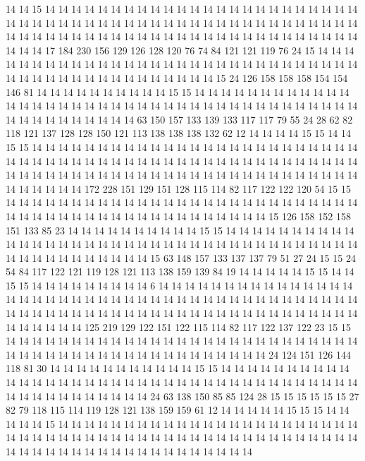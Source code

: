14 14 15 14 14 14 14 14 14 14 14 14 14 14 14 14 14 14 14 14
14 14 14 14 14 14 14 14 14 14 14 14 14 14 14 14 14 14 14 14
14 14 14 14 14 14 14 14 14 14 14 14 14 14 14 14 14 14 14 14
14 14 14 14 14 14 14 14 14 14 14 14 14 14 14 14 14 14 14 14
14 14 14 14 17 184 230 156 129 126 128 120 76 74 84 121 121 119 76 24
15 14 14 14 14 14 14 14 14 14 14 14 14 14 14 14 14 14 14 14
14 14 14 14 14 14 14 14 14 14 14 14 14 14 14 14 14 14 14 14
14 14 14 14 14 14 14 15 24 126 158 158 158 154 154 146 81 14 14 14
14 14 14 14 14 14 14 15 15 14 14 14 14 14 14 14 14 14 14 14
14 14 14 14 14 14 14 14 14 14 14 14 14 14 14 14 14 14 14 14
14 14 14 14 14 14 14 14 14 14 14 14 14 14 14 14 14 14 63 150
157 133 139 133 117 117 79 55 24 28 62 82 118 121 137 128 128 150 121 113
138 138 138 132 62 12 14 14 14 14 15 15 14 14 15 15 14 14 14 14
14 14 14 14 14 14 14 14 14 14 14 14 14 14 14 14 14 14 14 14
14 14 14 14 14 14 14 14 14 14 14 14 14 14 14 14 14 14 14 14
14 14 14 14 14 14 14 14 14 14 14 14 14 14 14 14 14 14 14 14
14 14 14 14 14 14 14 14 14 14 14 14 14 14 14 14 14 14 14 14
14 172 228 151 129 151 128 115 114 82 117 122 122 120 54 15 15 14 14 14
14 14 14 14 14 14 14 14 14 14 14 14 14 14 14 14 14 14 14 14
14 14 14 14 14 14 14 14 14 14 14 14 14 14 14 14 14 14 14 14
14 14 14 14 15 126 158 152 158 151 133 85 23 14 14 14 14 14 14 14
14 14 14 15 15 14 14 14 14 14 14 14 14 14 14 14 14 14 14 14
14 14 14 14 14 14 14 14 14 14 14 14 14 14 14 14 14 14 14 14
14 14 14 14 14 14 14 14 14 14 14 14 14 15 63 148 157 133 137 137
79 51 27 24 15 15 24 54 84 117 122 121 119 128 121 113 138 159 139 84
19 14 14 14 14 14 15 15 14 14 15 15 14 14 14 14 14 14 14 14
14 6 14 14 14 14 14 14 14 14 14 14 14 14 14 14 14 14 14 14
14 14 14 14 14 14 14 14 14 14 14 14 14 14 14 14 14 14 14 14
14 14 14 14 14 14 14 14 14 14 14 14 14 14 14 14 14 14 14 14
14 14 14 14 14 14 14 14 14 14 14 14 14 14 14 14 14 125 219 129
122 151 122 115 114 82 117 122 137 122 23 15 15 14 14 14 14 14 14 14
14 14 14 14 14 14 14 14 14 14 14 14 14 14 14 14 14 14 14 14
14 14 14 14 14 14 14 14 14 14 14 14 14 14 14 14 14 14 14 14
24 124 151 126 144 118 81 30 14 14 14 14 14 14 14 14 14 14 14 15
15 14 14 14 14 14 14 14 14 14 14 14 14 14 14 14 14 14 14 14
14 14 14 14 14 14 14 14 14 14 14 14 14 14 14 14 14 14 14 14
14 14 14 14 14 14 14 14 14 24 63 138 150 85 85 124 28 15 15 15
15 15 15 27 82 79 118 115 114 119 128 121 138 159 159 61 12 14 14 14
14 14 15 15 15 14 14 14 14 14 15 14 14 14 14 14 14 14 14 14
14 14 14 14 14 14 14 14 14 14 14 14 14 14 14 14 14 14 14 14
14 14 14 14 14 14 14 14 14 14 14 14 14 14 14 14 14 14 14 14
14 14 14 14 14 14 14 14 14 14 14 14 14 14 14 14 14 14 14 14
